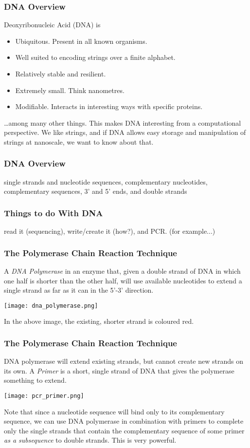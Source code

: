 \documentclass{beamer}
\begin{document}
\begin{frame}
\frametitle{DNA Overview}
Deoxyribonucleic Acid (DNA) is
\begin{itemize}
\item Ubiquitous. Present in all known organisms.
\item Well suited to encoding strings over a finite alphabet.
\item Relatively stable and resilient.
\item Extremely small. Think nanometres. 
\item Modifiable. Interacts in interesting ways with specific proteins.
\end{itemize}
\ldots among many other things. This makes DNA interesting from a computational perspective. We like strings, and if DNA allows easy storage and manipulation of strings at nanoscale, we want to know about that.
\end{frame}

\begin{frame}
\frametitle{DNA Overview}
single strands and nucleotide sequences, complementary nucleotides, complementary sequences, 3' and 5' ends, and double strands
\end{frame}


\begin{frame}
\frametitle{Things to do With DNA}
read it (sequencing), write/create it (how?), and PCR. (for example...)
\end{frame}

\begin{frame}
\frametitle{The Polymerase Chain Reaction Technique}
A \emph{DNA Polymerase} in an enzyme that, given a double strand of DNA in which one half is shorter than the other half, will use available nucleotides to extend a single strand as far as it can in the 5'-3' direction. 
\begin{center}
\texttt{[image: dna\_polymerase.png]}
\end{center}
In the above image, the existing, shorter strand is coloured red.
\end{frame}

\begin{frame}
\frametitle{The Polymerase Chain Reaction Technique}
DNA polymerase will extend existing strands, but cannot create new strands on its own. A \emph{Primer} is a short, single strand of DNA that gives the polymerase something to extend. 
\begin{center}
\texttt{[image: pcr\_primer.png]}
\end{center}
Note that since a nucleotide sequence will bind only to its complementary sequence, we can use DNA polymerase in combination with primers to complete only the single strands that contain the complementary sequence of some primer \emph{as a subsequence} to double strands. This is very powerful.
\end{frame}
\end{document}
